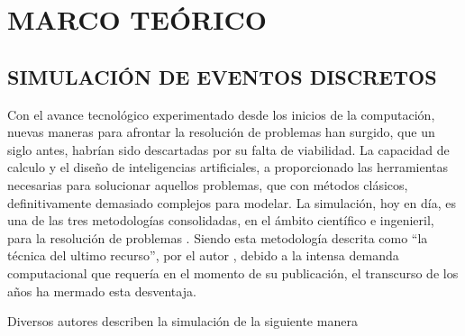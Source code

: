 
\section{MARCO TEÓRICO}

\subsection{SIMULACIÓN DE EVENTOS DISCRETOS}

Con el avance tecnológico experimentado desde los inicios de la computación,
nuevas maneras para afrontar la resolución de problemas han surgido,
que un siglo antes, habrían sido descartadas por su falta de viabilidad.
La capacidad de calculo y el diseño de inteligencias artificiales,
a proporcionado las herramientas necesarias
para solucionar aquellos problemas, que con métodos clásicos,
definitivamente demasiado complejos para modelar.
La simulación, hoy en día, es una de las tres metodologías consolidadas,
en el ámbito científico e ingenieril,
para la resolución de problemas \citep{banks1998handbook}.
Siendo esta metodología descrita como ``la técnica del ultimo recurso'',
por el autor \citep{garzia1986discrete},
debido a la intensa demanda computacional
que requería en el momento de su publicación,
el transcurso de los años ha mermado esta desventaja.

Diversos autores describen la simulación de la siguiente manera

